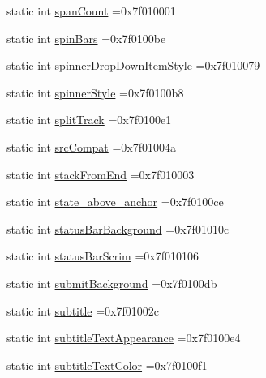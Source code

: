 \begin{DoxyCompactItemize}
\item 
static int \hyperlink{classandroid_1_1support_1_1v7_1_1cardview_1_1R_1_1attr_ab82ae971b854d4f764e718ce40d23e44}{span\+Count} =0x7f010001
\item 
static int \hyperlink{classandroid_1_1support_1_1v7_1_1cardview_1_1R_1_1attr_ae1b00aaf8423d096228a531fca8d1ab2}{spin\+Bars} =0x7f0100be
\item 
static int \hyperlink{classandroid_1_1support_1_1v7_1_1cardview_1_1R_1_1attr_a590a37b5fed89c38a8d1e814fd3d61ed}{spinner\+Drop\+Down\+Item\+Style} =0x7f010079
\item 
static int \hyperlink{classandroid_1_1support_1_1v7_1_1cardview_1_1R_1_1attr_acbf1a2eb7ad364b14112f295534337fc}{spinner\+Style} =0x7f0100b8
\item 
static int \hyperlink{classandroid_1_1support_1_1v7_1_1cardview_1_1R_1_1attr_aa85041f3a8ecbfff145615e0ac14f180}{split\+Track} =0x7f0100e1
\item 
static int \hyperlink{classandroid_1_1support_1_1v7_1_1cardview_1_1R_1_1attr_ad0878331bfa33ef9e4e6672067245514}{src\+Compat} =0x7f01004a
\item 
static int \hyperlink{classandroid_1_1support_1_1v7_1_1cardview_1_1R_1_1attr_a13a8615ddb6987faae277ec447427c83}{stack\+From\+End} =0x7f010003
\item 
static int \hyperlink{classandroid_1_1support_1_1v7_1_1cardview_1_1R_1_1attr_adea8ad1314d74568d3e4a64ff7a64192}{state\+\_\+above\+\_\+anchor} =0x7f0100ce
\item 
static int \hyperlink{classandroid_1_1support_1_1v7_1_1cardview_1_1R_1_1attr_a7089720b877cb43531e27184cd06867b}{status\+Bar\+Background} =0x7f01010c
\item 
static int \hyperlink{classandroid_1_1support_1_1v7_1_1cardview_1_1R_1_1attr_a0eaa00e33bfe549c91d9e06f97e36f72}{status\+Bar\+Scrim} =0x7f010106
\item 
static int \hyperlink{classandroid_1_1support_1_1v7_1_1cardview_1_1R_1_1attr_ad1f2599c7421633a092dd0dc4f166d8a}{submit\+Background} =0x7f0100db
\item 
static int \hyperlink{classandroid_1_1support_1_1v7_1_1cardview_1_1R_1_1attr_a05ab66196223ffd287bd23667d4122cd}{subtitle} =0x7f01002c
\item 
static int \hyperlink{classandroid_1_1support_1_1v7_1_1cardview_1_1R_1_1attr_ac11cc67ed57bc796e7e120d6c5b5e347}{subtitle\+Text\+Appearance} =0x7f0100e4
\item 
static int \hyperlink{classandroid_1_1support_1_1v7_1_1cardview_1_1R_1_1attr_a109d4dfb508eff6f5090aca6109b6ddb}{subtitle\+Text\+Color} =0x7f0100f1

\end{DoxyCompactItemize}
